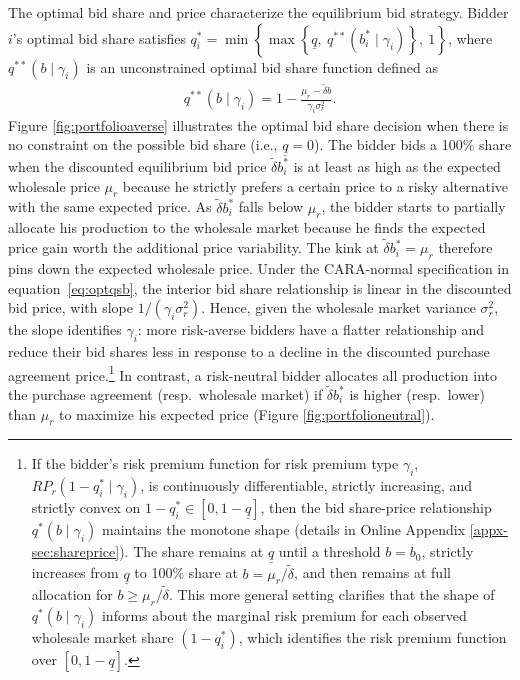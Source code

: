 \documentclass[12pt]{article}
\theoremstyle{definition} %
\begin{document}
The optimal bid share and price characterize the equilibrium bid strategy. Bidder $i$'s optimal bid share satisfies $q_i^\ast = \min \left\{\max \left\{\underline{q},\ q^{\ast\ast}(b_i^\ast \mid \gamma_i) \right\},\ 1 \right\}$, where $q^{\ast\ast}(b \mid \gamma_i)$ is an unconstrained optimal bid share function defined as
\begin{align}
\label{eq:optqsb}
q^{\ast\ast}(b \mid \gamma_i) = 1 - \frac{\mu_r - \tilde{\delta} b}{\gamma_i \sigma_r^2}.
\end{align}
Figure \ref{fig:portfolioaverse} illustrates the optimal bid share decision when there is no constraint on the possible bid share (i.e., $\underline{q}=0$). The bidder bids a 100\% share when the discounted equilibrium bid price $\tilde{\delta}b_i^\ast$ is at least as high as the expected wholesale price $\mu_r$ because he strictly prefers a certain price to a risky alternative with the same expected price. As $\tilde{\delta}b_i^\ast$ falls below $\mu_r$, the bidder starts to partially allocate his production to the wholesale market because he finds the expected price gain worth the additional price variability. The kink at $\tilde{\delta}b_i^\ast=\mu_r$ therefore pins down the expected wholesale price. Under the CARA-normal specification in equation~\eqref{eq:optqsb}, the interior bid share relationship is linear in the discounted bid price, with slope $1/(\gamma_i \sigma_r^2)$. Hence, given the wholesale market variance $\sigma_r^2$, the slope identifies $\gamma_i$: more risk-averse bidders have a flatter relationship and reduce their bid shares less in response to a decline in the discounted purchase agreement price.\footnote{
If the bidder's risk premium function for risk premium type $\gamma_i$, $RP_r(1-q_i^\ast \mid \gamma_i)$, is continuously differentiable, strictly increasing, and strictly convex on $1-q_i^\ast \in [0,1-\underline{q}]$, then the bid share-price relationship $q^\ast(b \mid \gamma_i)$ maintains the monotone shape (details in Online Appendix \ref{appx-sec:shareprice}). The share remains at $\underline{q}$ until a threshold $b=b_0$, strictly increases from $\underline{q}$ to 100\% share at $b=\mu_r/\tilde{\delta}$, and then remains at full allocation for $b \geq \mu_r/\tilde{\delta}$. This more general setting clarifies that the shape of $q^\ast(b \mid \gamma_i)$ informs about the marginal risk premium for each observed wholesale market share $(1-q_i^\ast)$, which identifies the risk premium function over $[0,1-\underline{q}]$.
}
In contrast, a risk-neutral bidder allocates all production into the purchase agreement (resp.\ wholesale market) if $\tilde{\delta}b_i^\ast$ is higher (resp.\ lower) than $\mu_r$ to maximize his expected price (Figure \ref{fig:portfolioneutral}).
\end{document}
